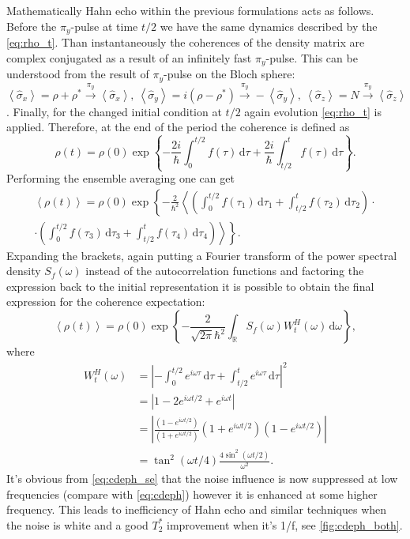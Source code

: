 \documentclass[12pt, twoside]{report}
\newcommand{\diff}{\,\mathrm{d}}
\numberwithin{equation}{section}
\begin{document}
Mathematically Hahn echo within the previous formulations acts as follows. Before the  $\pi_y$-pulse at time $t/2$ we have the same dynamics described by the \eqref{eq:rho_t}. Than instantaneously the coherences of the density matrix are complex conjugated as a result of an infinitely fast $\pi_y$-pulse. This can be understood from the result of $\pi_y$-pulse on the Bloch sphere: $\left< \hat \sigma_x \right> = \rho + \rho^* \overset{\pi_y}{\rightarrow}  \left< \hat \sigma_x \right>,\ \left< \hat \sigma_y \right> = i(\rho - \rho^*) \overset{\pi_y}{\rightarrow} -\left< \hat \sigma_y \right>,\ \left< \hat \sigma_z \right> = N  \overset{\pi_y}{\rightarrow}  \left< \hat \sigma_z \right>$. Finally, for the changed initial condition at $t/2$ again evolution \eqref{eq:rho_t} is applied. Therefore, at the end of the period the coherence is defined as
\begin{equation*}
\rho(t) = \rho(0)\exp \left\{ - \frac{2i}{\hbar}\int_0^{t/2} f(\tau)  \diff \tau + \frac{2i}{\hbar}\int_{t/2}^{t} f(\tau)  \diff \tau \right\}.
\end{equation*}
Performing the ensemble averaging one can get
\begin{gather*}
\left<\rho(t)\right> = \rho(0)\exp \left\{ - \frac{2}{\hbar^2} \left< \left( \int_0^{t/2} f(\tau_1)  \diff \tau_1 + \int_{t/2}^{t} f(\tau_2)  \diff \tau_2 \right)\cdot \right. \right. \\
\cdot \left. \left. \left( \int_0^{t/2} f(\tau_3)  \diff \tau_3 + \int_{t/2}^{t} f(\tau_4)  \diff \tau_4 \right) \right> \right\}.
\end{gather*}
Expanding the brackets, again putting a Fourier transform of the power spectral density $S_f(\omega)$ instead of the autocorrelation functions and factoring the expression back to the initial representation it is possible to obtain\cite{Preskill} the final expression for the coherence expectation:
\begin{equation}
\left<\rho(t)\right> = \rho(0)\exp \left\{ - \frac{2}{\sqrt{2\pi} \hbar^2} \int_\mathbb{R} S_f(\omega) W^H_t (\omega) \diff\omega \right\},
\label{eq:cdeph_se}
\end{equation}
where
\begin{align*}
 W^H_t (\omega)  &= \left| - \int_0^{t/2} e^{i \omega \tau}\diff \tau + \int_{t/2}^{t} e^{i\omega\tau}  \diff \tau  \right|^2 \\
& =  \left| 1-2e^{i\omega t/2} + e^{i\omega t} \right| \\
&= \left| \frac{(1-e^{i\omega t/2})}{(1+e^{i\omega t/2})} (1+e^{i\omega t/2})(1-e^{i\omega t/2})\right|\\
& = \tan^2(\omega t/4)\frac{4 \sin^2(\omega t/2)}{\omega^2}.
\end{align*}
It's obvious from \eqref{eq:cdeph_se}  that the noise influence is now suppressed at low frequencies (compare with \eqref{eq:cdeph}) however it is enhanced at some higher frequency. This leads to inefficiency of Hahn echo and similar techniques when the noise is white and a good $T_2^*$ improvement when it's 1/f, see \autoref{fig:cdeph_both}.
\end{document}
